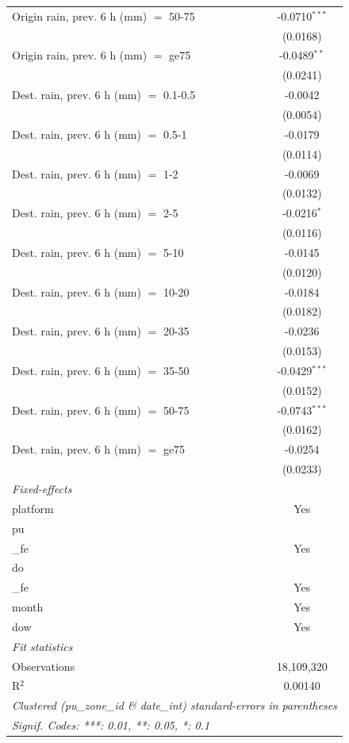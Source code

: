 \begin{tabular}{lc}
   Origin rain, prev. 6 h (mm) $=$ 50-75 & -0.0710$^{***}$\\
    & (0.0168)\\
   Origin rain, prev. 6 h (mm) $=$ ge75 & -0.0489$^{**}$\\
    & (0.0241)\\
   Dest. rain, prev. 6 h (mm) $=$ 0.1-0.5 & -0.0042\\
    & (0.0054)\\
   Dest. rain, prev. 6 h (mm) $=$ 0.5-1 & -0.0179\\
    & (0.0114)\\
   Dest. rain, prev. 6 h (mm) $=$ 1-2 & -0.0069\\
    & (0.0132)\\
   Dest. rain, prev. 6 h (mm) $=$ 2-5 & -0.0216$^{*}$\\
    & (0.0116)\\
   Dest. rain, prev. 6 h (mm) $=$ 5-10 & -0.0145\\
    & (0.0120)\\
   Dest. rain, prev. 6 h (mm) $=$ 10-20 & -0.0184\\
    & (0.0182)\\
   Dest. rain, prev. 6 h (mm) $=$ 20-35 & -0.0236\\
    & (0.0153)\\
   Dest. rain, prev. 6 h (mm) $=$ 35-50 & -0.0429$^{***}$\\
    & (0.0152)\\
   Dest. rain, prev. 6 h (mm) $=$ 50-75 & -0.0743$^{***}$\\
    & (0.0162)\\
   Dest. rain, prev. 6 h (mm) $=$ ge75 & -0.0254\\
    & (0.0233)\\
   \midrule
   \emph{Fixed-effects}\\
   platform & Yes\\
   pu\\_fe & Yes\\
   do\\_fe & Yes\\
   month & Yes\\
   dow & Yes\\
   \midrule
   \emph{Fit statistics}\\
   Observations & 18,109,320\\
   R$^2$ & 0.00140\\
   \midrule \midrule
   \multicolumn{2}{l}{\emph{Clustered (pu\_zone\_id \& date\_int) standard-errors in parentheses}}\\
   \multicolumn{2}{l}{\emph{Signif. Codes: ***: 0.01, **: 0.05, *: 0.1}}\\
\end{tabular}
 
